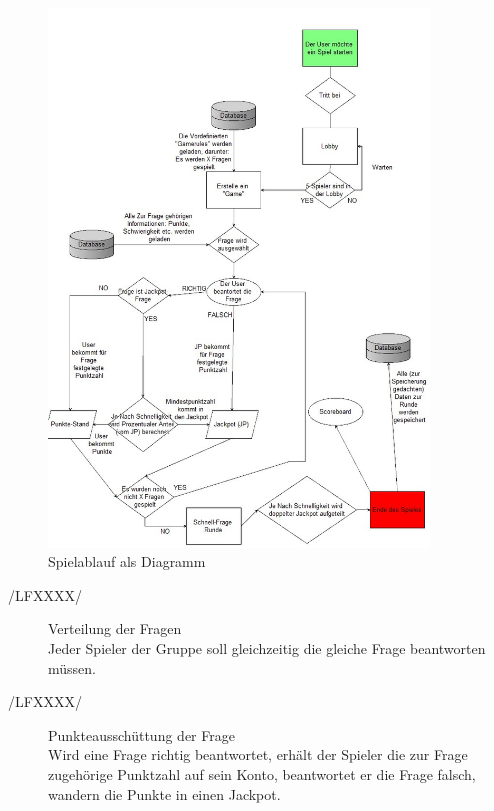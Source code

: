 \documentclass[11pt,a4paper]{scrreprt}
\begin{document}
\begin{figure}
	\centering
	\includegraphics[width=0.9\textwidth, height=0.9\textheight]{Diagramm_002.jpg}
	\caption{Spielablauf als Diagramm}
	\label{img:Spielablauf}
\end{figure}
\begin{description}
\item[/LFXXXX/]Verteilung der Fragen \\
Jeder Spieler der Gruppe soll gleichzeitig die gleiche Frage beantworten müssen.
 
\item[/LFXXXX/]Punkteausschüttung der Frage \\
Wird eine Frage richtig beantwortet, erhält der Spieler die zur Frage zugehörige Punktzahl auf sein Konto,  beantwortet er die Frage falsch, wandern die Punkte in einen Jackpot.
\end{description}
\end{document}
